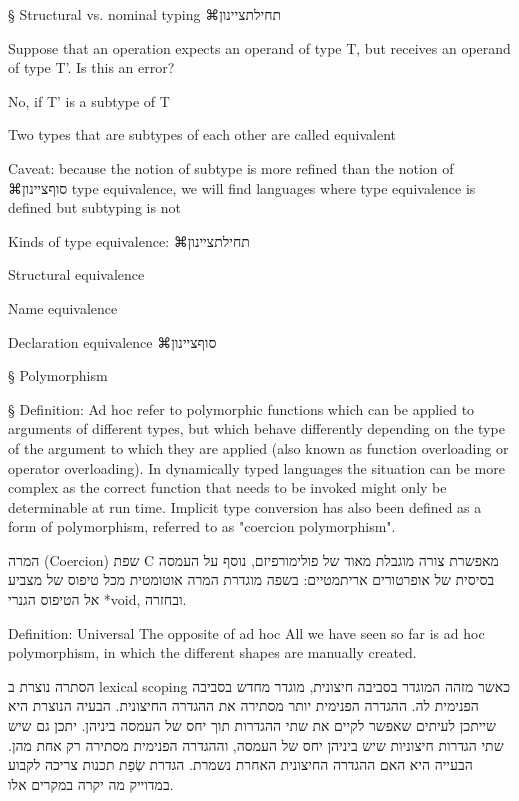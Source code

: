 §        Structural vs. nominal typing
        ⌘תחילת{ציינון}
          \item Suppose that an operation expects an operand of type T, but receives
          an operand of type T’. Is this an error?
          \item No, if T’ is a subtype of T
          \item Two types that are subtypes of each other are called equivalent
          \item Caveat: because the notion of subtype is more refined than the notion of
        ⌘סוף{ציינון}
        type equivalence, we will find languages where type equivalence is
        defined but subtyping is not

        Kinds of type equivalence:
        ⌘תחילת{ציינון}
          \item Structural equivalence
          \item Name equivalence
          \item Declaration equivalence
        ⌘סוף{ציינון}

§        Polymorphism

§        Definition: Ad hoc
        refer to polymorphic functions which can be applied to arguments of different types, but which behave differently depending on the type of the argument to which they are applied (also known as function overloading or operator overloading).
        In dynamically typed languages the situation can be more complex as the correct function that needs to be invoked might only be determinable at run time.
        Implicit type conversion has also been defined as a form of polymorphism, referred to as "coercion polymorphism".

        המרה (Coercion)
        שפת C מאפשרת צורה מוגבלת מאוד של פולימורפיזם, נוסף על העמסה בסיסית של אופרטורים אריתמטיים: בשפה מוגדרת המרה אוטומטית מכל טיפוס של מצביע אל הטיפוס הגנרי *void, ובחזרה.

        Definition: Universal
        The opposite of ad hoc All we have seen so far is ad hoc polymorphism, in which the different shapes are manually created.

        הסתרה נוצרת ב lexical scoping כאשר מזהה המוגדר בסביבה חיצונית, מוגדר מחדש בסביבה הפנימית לה. ההגדרה הפנימית יותר מסתירה את ההגדרה החיצונית. הבעיה הנוצרת היא שייתכן לעיתים שאפשר לקיים את שתי ההגדרות תוך יחס של העמסה ביניהן. יתכן גם שיש שתי הגדרות חיצוניות שיש ביניהן יחס של העמסה, וההגדרה הפנימית מסתירה רק אחת מהן. הבעייה היא האם ההגדרה החיצונית האחרת נשמרת. הגדרת שְׂפַת תכנות צריכה לקבוע במדוייק מה יקרה במקרים אלו.

